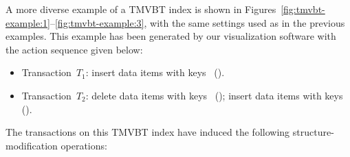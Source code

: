 A more diverse example of a TMVBT index is shown in
Figures~\ref{fig:tmvbt-example:1}--\ref{fig:tmvbt-example:3}, with the same
settings used as in the previous examples. 
This example has been generated by our visualization software with
the action sequence given below:

\begin{itemize}
  \setlength{\itemsep}{0pt}
  \item Transaction~$T_1$: insert data items with keys~
  ().
  \item Transaction~$T_2$: delete data items with keys~
  (); insert data items with keys~
  ().
\end{itemize}

\begin{figure*}[htb]
\begin{center}
  
  \label{fig:tmvbt-example:1}
\end{center}
\end{figure*}

\begin{figure*}[htb]
\begin{center}
  
  \label{fig:tmvbt-example:2}
\end{center}
\end{figure*}

\begin{figure*}[htb]
\begin{center}
  
  \label{fig:tmvbt-example:3}
\end{center}
\end{figure*}

The transactions on this TMVBT index have induced the following 
structure-modification operations:

